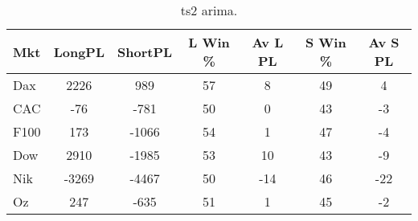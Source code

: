 \begin{table}[ht]
\centering
\caption[ts2 arima.]{ts2 arima.} 
\label{tab:chp_ts:arima2}
\begin{tabular}{lcccccc}
  \toprule Mkt & LongPL & ShortPL & L Win \% & Av L PL & S Win \% & Av S PL \\ 
  \midrule Dax & 2226 & 989 & 57 & 8 & 49 & 4 \\ 
  CAC & -76 & -781 & 50 & 0 & 43 & -3 \\ 
  F100 & 173 & -1066 & 54 & 1 & 47 & -4 \\ 
  Dow & 2910 & -1985 & 53 & 10 & 43 & -9 \\ 
  Nik & -3269 & -4467 & 50 & -14 & 46 & -22 \\ 
  Oz & 247 & -635 & 51 & 1 & 45 & -2 \\ 
   \bottomrule \end{tabular}
\end{table}
